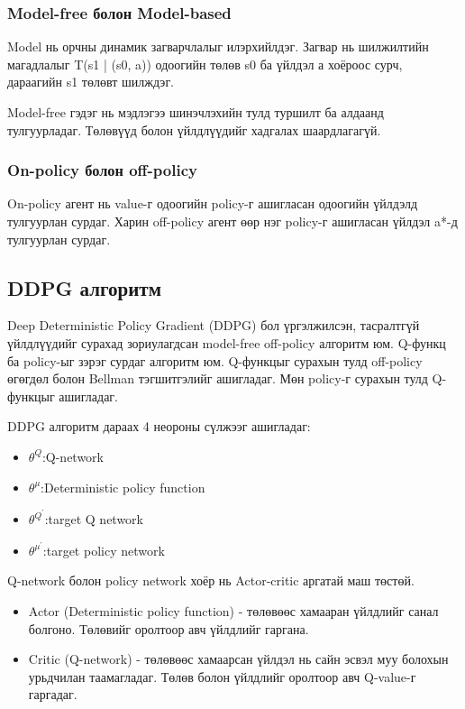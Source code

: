 \documentclass[12pt,A4]{report}
\begin{document}
\subsubsection{Model-free болон Model-based}

Model нь орчны динамик загварчлалыг илэрхийлдэг. Загвар нь шилжилтийн магадлалыг T(s1 | (s0, a)) одоогийн төлөв s0 ба үйлдэл а хоёроос  сурч, дараагийн s1 төлөвт шилждэг.

Model-free гэдэг нь мэдлэгээ шинэчлэхийн тулд туршилт ба алдаанд тулгуурладаг. Төлөвүүд болон үйлдлүүдийг хадгалах шаардлагагүй. 

\subsubsection{On-policy болон off-policy}

On-policy агент нь value-г одоогийн policy-г ашигласан одоогийн үйлдэлд тулгуурлан сурдаг. Харин off-policy агент өөр нэг policy-г ашигласан үйлдэл a*-д тулгуурлан сурдаг.

\subsection{DDPG алгоритм}

Deep Deterministic Policy Gradient (DDPG) бол үргэлжилсэн, тасралтгүй үйлдлүүдийг сурахад зориулагдсан model-free off-policy алгоритм юм. Q-функц ба policy-ыг зэрэг сурдаг алгоритм юм. Q-функцыг сурахын тулд off-policy өгөгдөл болон Bellman тэгшитгэлийг ашигладаг. Мөн policy-г сурахын тулд Q-функцыг ашигладаг. 

DDPG алгоритм дараах 4 неороны сүлжээг ашигладаг:
\begin{itemize}
	\item ${\theta}^Q$:Q-network
	\item ${\theta}^{\mu}$:Deterministic policy function
	\item ${\theta}^{Q^{'}}$:target Q network
	\item ${\theta}^{{\mu}^{'}}$:target policy network
\end{itemize} 
 
 Q-network болон policy network хоёр нь Actor-critic аргатай маш төстөй. 
 
\begin{itemize}
	\item Actor (Deterministic policy function) - төлөвөөс хамааран үйлдлийг санал болгоно. Төлөвийг оролтоор авч үйлдлийг гаргана.
	\item Critic (Q-network) - төлөвөөс хамаарсан үйлдэл нь сайн эсвэл муу болохын урьдчилан таамагладаг. Төлөв болон үйлдлийг оролтоор авч Q-value-г гаргадаг.
\end{itemize}
\end{document}
